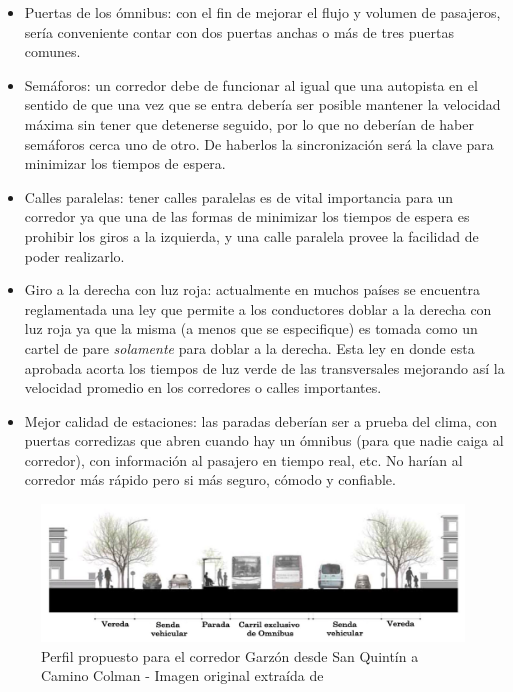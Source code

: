 \begin{itemize}
	\item Puertas de los ómnibus: con el fin de mejorar el flujo y volumen de pasajeros, sería conveniente contar con dos puertas anchas o más de tres puertas comunes.
	\item Semáforos: un corredor debe de funcionar al igual que una autopista en el sentido de que una vez que se entra debería ser posible mantener la velocidad máxima sin tener que detenerse seguido, por lo que no deberían de haber semáforos cerca uno de otro. De haberlos la sincronización será la clave para minimizar los tiempos de espera.
	\item Calles paralelas: tener calles paralelas es de vital importancia para un corredor ya que una de las formas de minimizar los tiempos de espera es prohibir los giros a la izquierda, y una calle paralela provee la facilidad de poder realizarlo.
	\item Giro a la derecha con luz roja: actualmente en muchos países se encuentra reglamentada una ley que permite a los conductores doblar a la derecha con luz roja ya que la misma (a menos que se especifique) es tomada como un cartel de pare \emph{solamente} para doblar a la derecha. Esta ley en donde esta aprobada acorta los tiempos de luz verde de las transversales mejorando así la velocidad promedio en los corredores o calles importantes.
	\item Mejor calidad de estaciones: las paradas deberían ser a prueba del clima, con puertas corredizas que abren cuando hay un ómnibus (para que nadie caiga al corredor), con información al pasajero en tiempo real, etc. No harían al corredor más rápido pero si más seguro, cómodo y confiable.
\end{itemize}


\begin{figure}[H]
	\centering
	\includegraphics[width=0.9\linewidth]{Figures/busway_configuration}
	\caption[Perfil propuesto para el corredor Garzón.]{Perfil propuesto para el corredor Garzón desde San Quintín a Camino Colman - Imagen original extraída de \citep{PlanMovilidad}
	}
	\label{fig:perfil_garzon}
\end{figure}

